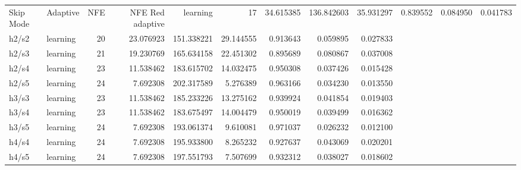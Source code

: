 \begin{tabular}{llrrrrrrr}
\toprule
Skip Mode & Adaptive & NFE & NFE Red %
\midrule
adaptive & learning & 17 & 34.615385 & 136.842603 & 35.931297 & 0.839552 & 0.084950 & 0.041783 \\
h2/s2 & learning & 20 & 23.076923 & 151.338221 & 29.144555 & 0.913643 & 0.059895 & 0.027833 \\
h2/s3 & learning & 21 & 19.230769 & 165.634158 & 22.451302 & 0.895689 & 0.080867 & 0.037008 \\
h2/s4 & learning & 23 & 11.538462 & 183.615702 & 14.032475 & 0.950308 & 0.037426 & 0.015428 \\
h2/s5 & learning & 24 & 7.692308 & 202.317589 & 5.276389 & 0.963166 & 0.034230 & 0.013550 \\
h3/s3 & learning & 23 & 11.538462 & 185.233226 & 13.275162 & 0.939924 & 0.041854 & 0.019403 \\
h3/s4 & learning & 23 & 11.538462 & 183.675497 & 14.004479 & 0.950019 & 0.039499 & 0.016362 \\
h3/s5 & learning & 24 & 7.692308 & 193.061374 & 9.610081 & 0.971037 & 0.026232 & 0.012100 \\
h4/s4 & learning & 24 & 7.692308 & 195.933800 & 8.265232 & 0.927637 & 0.043069 & 0.020201 \\
h4/s5 & learning & 24 & 7.692308 & 197.551793 & 7.507699 & 0.932312 & 0.038027 & 0.018602 \\
\bottomrule
\end{tabular}
